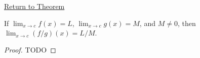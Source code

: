 \newpage
{}
\label{prf:quotient-rule-function-limits}

\begin{remark*}[Return]
\hyperref[thm:quotient-rule-function-limits]{Return to Theorem}
\end{remark*}

\begin{theorem*}
If $\lim_{x\to c}f(x)=L$, $\lim_{x\to c}g(x)=M$, and $M\neq 0$, then $\lim_{x\to c}(f/g)(x)=L/M$.
\end{theorem*}

\begin{proof}
TODO
\end{proof}
